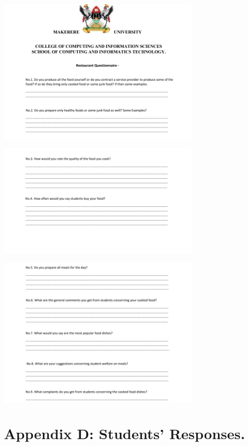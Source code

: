 \documentclass{article}
\begin{document}
\vspace{30pt}
\begin{center}

    \includegraphics[width=380px]{images/restuarant1.PNG}

    \includegraphics[width=380px]{images/restuarant2.PNG}

    \includegraphics[width=380px]{images/restuarant3.PNG}


\end{center}


\newpage
\appendix
\renewcommand{\thesection}{} %
\section{Appendix D: Students' Responses. }
\end{document}
